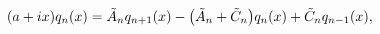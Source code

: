 \[(a+ix)q_{n}(x)=\tilde{A}_{n}q_{n+1}(x)-\bigl{(}\tilde{A}_{n}+\tilde{C}_{n}%
\bigr{)}q_{n}(x)+\tilde{C}_{n}q_{n-1}(x),\]